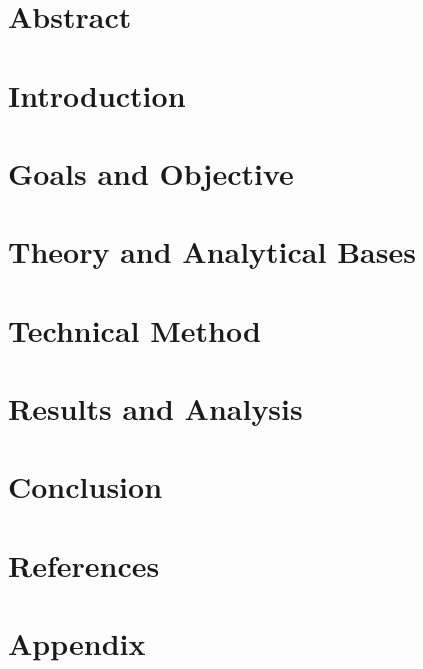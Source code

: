 \documentclass[a4paper,12pt,twocolumn]{article}
\begin{document}
	\pagebreak
	\section{Abstract}\label{sec:abstract}
	
	\section{Introduction}\label{sec:introduction}
	
	\section{Goals and Objective}\label{sec:objectives}
	
	\section{Theory and Analytical Bases}\label{sec:theory}
	
	\section{Technical Method}\label{sec:methods}
	
	\section{Results and Analysis}\label{sec:results}
	
	\section{Conclusion}\label{sec:conclusion}
	
	\section{References}
	\printbibliography
	\pagebreak
	\onecolumn
	\section{Appendix}\label{sec:appendix}
	
	
\end{document}
